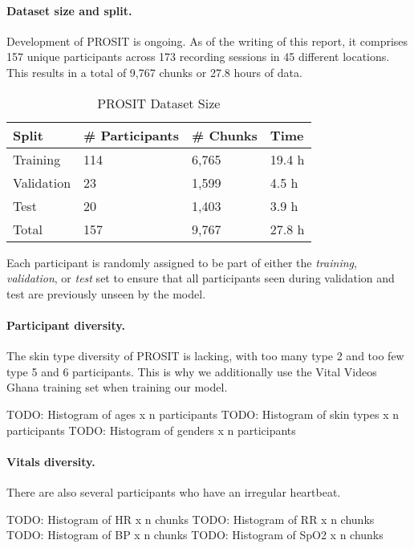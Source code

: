 \documentclass{article}
\begin{document}
\paragraph{Dataset size and split.}
Development of PROSIT is ongoing.
As of the writing of this report, it comprises 157 unique participants across 173 recording sessions in 45 different locations.
This results in a total of 9,767 chunks or 27.8 hours of data.

\begin{table}[h!]
  \caption{PROSIT Dataset Size}
  \label{prosit-table}
  \centering
  \begin{tabular}{llll}
    \toprule
    Split      & \# Participants & \# Chunks & Time   \\
    \midrule
    Training   & 114 			 & 6,765     & 19.4 h \\
    Validation & 23 			 & 1,599     & 4.5 h  \\
    Test       & 20     			 & 1,403     & 3.9 h  \\
    \midrule
    Total      & 157			 & 9,767  	 & 27.8 h \\
    \bottomrule
  \end{tabular}
\end{table}

Each participant is randomly assigned to be part of either the \textit{training}, \textit{validation}, or \textit{test} set to ensure that all participants seen during validation and test are previously unseen by the model.

\paragraph{Participant diversity.}
The skin type diversity of PROSIT is lacking, with too many type 2 and too few type 5 and 6 participants.
This is why we additionally use the Vital Videos Ghana training set when training our model.

TODO: Histogram of ages x n participants
TODO: Histogram of skin types x n participants
TODO: Histogram of genders x n participants

\paragraph{Vitals diversity.}
There are also several participants who have an irregular heartbeat.

TODO: Histogram of HR x n chunks
TODO: Histogram of RR x n chunks
TODO: Histogram of BP x n chunks
TODO: Histogram of SpO2 x n chunks
\end{document}
